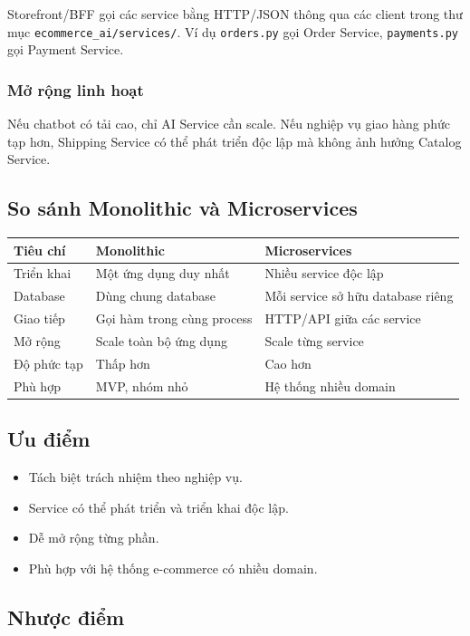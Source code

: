 \documentclass[12pt,a4paper]{report}
\begin{document}
Storefront/BFF gọi các service bằng HTTP/JSON thông qua các client trong thư mục \texttt{ecommerce\_ai/services/}. Ví dụ \texttt{orders.py} gọi Order Service, \texttt{payments.py} gọi Payment Service.

\subsubsection{Mở rộng linh hoạt}

Nếu chatbot có tải cao, chỉ AI Service cần scale. Nếu nghiệp vụ giao hàng phức tạp hơn, Shipping Service có thể phát triển độc lập mà không ảnh hưởng Catalog Service.

\subsection{So sánh Monolithic và Microservices}

\begin{longtable}{|p{4cm}|p{5cm}|p{5cm}|}
\hline
\textbf{Tiêu chí} & \textbf{Monolithic} & \textbf{Microservices} \\
\hline
Triển khai & Một ứng dụng duy nhất & Nhiều service độc lập \\
\hline
Database & Dùng chung database & Mỗi service sở hữu database riêng \\
\hline
Giao tiếp & Gọi hàm trong cùng process & HTTP/API giữa các service \\
\hline
Mở rộng & Scale toàn bộ ứng dụng & Scale từng service \\
\hline
Độ phức tạp & Thấp hơn & Cao hơn \\
\hline
Phù hợp & MVP, nhóm nhỏ & Hệ thống nhiều domain \\
\hline
\end{longtable}

\subsection{Ưu điểm}

\begin{itemize}
  \item Tách biệt trách nhiệm theo nghiệp vụ.
  \item Service có thể phát triển và triển khai độc lập.
  \item Dễ mở rộng từng phần.
  \item Phù hợp với hệ thống e-commerce có nhiều domain.
\end{itemize}

\subsection{Nhược điểm}
\end{document}
